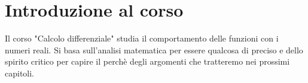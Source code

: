 \chapter{Introduzione al corso}
Il corso "Calcolo differenziale" studia il comportamento delle funzioni con i numeri reali.
Si basa sull'analisi matematica per essere qualcosa di preciso e dello spirito critico per capire il perchè degli argomenti che tratteremo nei prossimi capitoli.